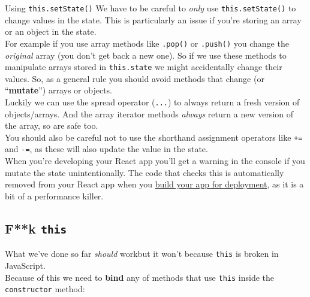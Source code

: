 \begin{infobox}{Using \texttt{this.setState()}}
    We have to be careful to \textit{only} use \texttt{this.setState()} to change values in the state. This is particularly an issue if you're storing an array or an object in the state.
    \\

    For example if you use array methods like \texttt{.pop()} or \texttt{.push()} you change the \textit{original} array (you don't get back a new one). So if we use these methods to manipulate arrays stored in \texttt{this.state} we might accidentally change their values. So, as a general rule you should avoid methods that change (or ``\textbf{mutate}'') arrays or objects.
    \\

    Luckily we can use the spread operator (\texttt{...}) to always return a fresh version of objects/arrays. And the array iterator methods \textit{always} return a new version of the array, so are safe too.
    \\

    You should also be careful not to use the shorthand assignment operators like \texttt{+=} and \texttt{-=}, as these will also update the value in the state.
    \\

    When you're developing your React app you'll get a warning in the console if you mutate the state unintentionally. The code that checks this is automatically removed from your React app when you \hyperref[deployment]{build your app for deployment}, as it is a bit of a performance killer.
\end{infobox}


\pagebreak


\subsection{F**k \texttt{this}}


What we've done so far \textit{should} work\textellipsis{ }but it won't because \texttt{this} is broken in JavaScript.
\\

Because of this we need to \textbf{bind} any of methods that use \texttt{this} inside the \texttt{constructor} method:

